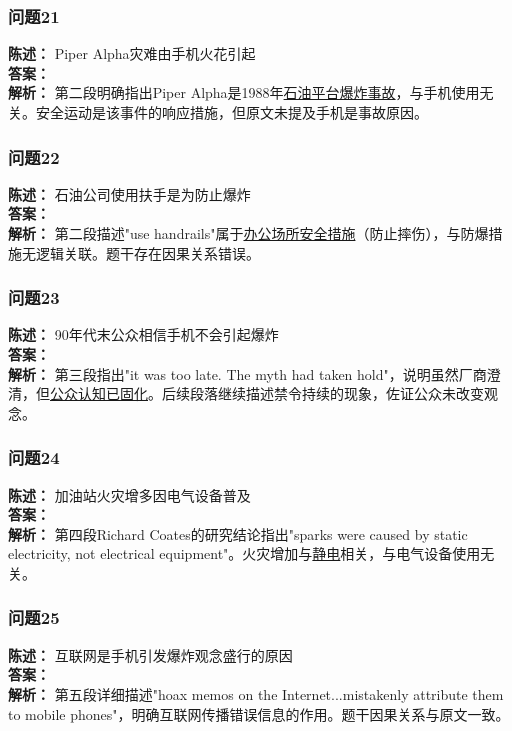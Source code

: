 \documentclass{article}
\begin{document}
\subsubsection*{问题21}
\textbf{陈述：} Piper Alpha灾难由手机火花引起 \\
\textbf{答案：}  \\
\textbf{解析：} 第二段明确指出Piper Alpha是1988年\underline{石油平台爆炸事故}，与手机使用无关。安全运动是该事件的响应措施，但原文未提及手机是事故原因。

\subsubsection*{问题22}
\textbf{陈述：} 石油公司使用扶手是为防止爆炸 \\
\textbf{答案：}  \\
\textbf{解析：} 第二段描述"use handrails"属于\underline{办公场所安全措施}（防止摔伤），与防爆措施无逻辑关联。题干存在因果关系错误。

\subsubsection*{问题23}
\textbf{陈述：} 90年代末公众相信手机不会引起爆炸 \\
\textbf{答案：}  \\
\textbf{解析：} 第三段指出"it was too late. The myth had taken hold"，说明虽然厂商澄清，但\underline{公众认知已固化}。后续段落继续描述禁令持续的现象，佐证公众未改变观念。

\subsubsection*{问题24}
\textbf{陈述：} 加油站火灾增多因电气设备普及 \\
\textbf{答案：}  \\
\textbf{解析：} 第四段Richard Coates的研究结论指出"sparks were caused by static electricity, not electrical equipment"。火灾增加与\underline{静电}相关，与电气设备使用无关。

\subsubsection*{问题25}
\textbf{陈述：} 互联网是手机引发爆炸观念盛行的原因 \\
\textbf{答案：}  \\
\textbf{解析：} 第五段详细描述"hoax memos on the Internet...mistakenly attribute them to mobile phones"，明确互联网传播错误信息的作用。题干因果关系与原文一致。
\end{document}
